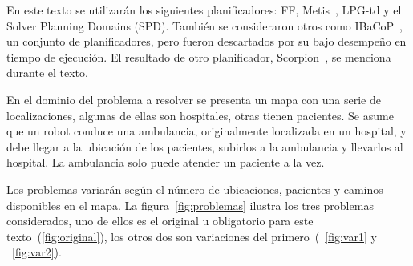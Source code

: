 \documentclass[a4paper,12pt,twocolumn]{article}
\begin{document}
En este texto se utilizarán los siguientes planificadores: FF, Metis~\citep{sievers2018metis}, LPG-td y el Solver Planning Domains (SPD). También se consideraron otros como IBaCoP~\citep{cenamor2018ibacop}, un conjunto de planificadores, pero fueron descartados por su bajo desempeño en tiempo de ejecución. El resultado de otro planificador, Scorpion~\citep{seipp2018scorpion},  se menciona durante el texto.

En el dominio del problema a resolver se presenta un mapa con una serie de localizaciones, algunas de ellas son hospitales, otras tienen pacientes. Se asume que un robot conduce una ambulancia, originalmente localizada en un hospital, y debe llegar a la ubicación de los pacientes, subirlos a la ambulancia y llevarlos al hospital. La ambulancia solo puede atender un paciente a la vez.

Los problemas variarán según el número de ubicaciones, pacientes y caminos disponibles en el mapa. La figura~\ref{fig:problemas} ilustra los tres problemas considerados, uno de ellos es el original u obligatorio para este texto~(\ref{fig:original}), los otros dos son variaciones del primero~(~\ref{fig:var1} y ~\ref{fig:var2}).
\end{document}
